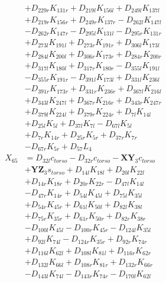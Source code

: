 \begin{multicols}{2}
\begin{align}
&+ D_{229r}K_{131r} + D_{219l}K_{156l} + D_{249l}K_{137l}  \nonumber \\
&+ D_{219r}K_{156r} + D_{249r}K_{137r} - D_{262l}K_{147l}  \nonumber \\
&- D_{262r}K_{147r} - D_{295l}K_{131l} - D_{295r}K_{131r}  \nonumber \\
&+ D_{273l}K_{191l} + D_{273r}K_{191r} + D_{306l}K_{173l}  \nonumber \\
&+ D_{284l}K_{200l} + D_{306r}K_{173r} + D_{284r}K_{200r}  \nonumber \\
&+ D_{317l}K_{180l} + D_{317r}K_{180r} - D_{355l}K_{191l}  \nonumber \\
&- D_{355r}K_{191r} - D_{391l}K_{173l} + D_{331l}K_{236l}  \nonumber \\
&- D_{391r}K_{173r} + D_{331r}K_{236r} + D_{367l}K_{216l}  \nonumber \\
&+ D_{343l}K_{247l} + D_{367r}K_{216r} + D_{343r}K_{247r}  \nonumber \\
&+ D_{379l}K_{224l} + D_{379r}K_{224r} + D_{7l}K_{14l}  \nonumber \\
&+ D_{25l}K_{5l} + D_{37l}K_{7l} - D_{67l}K_{5l}  \nonumber \\
&+ D_{7r}K_{14r} + D_{25r}K_{5r} + D_{37r}K_{7r}  \nonumber \\
&- D_{67r}K_{5r} + D_{57}L_4 \nonumber \\
X_{65} &= D_{32l}c_{torso} - D_{32r}c_{torso} - \mathbf{XY}_3c_{torso}  \nonumber \\
&+ \mathbf{YZ}_3s_{torso} + D_{14l}K_{18l} + D_{20l}K_{22l}  \nonumber \\
&+ D_{14r}K_{18r} + D_{20r}K_{22r} - D_{47l}K_{14l}  \nonumber \\
&- D_{47r}K_{14r} + D_{54l}K_{45l} + D_{75l}K_{35l}  \nonumber \\
&+ D_{54r}K_{45r} + D_{61l}K_{50l} + D_{82l}K_{38l}  \nonumber \\
&+ D_{75r}K_{35r} + D_{61r}K_{50r} + D_{82r}K_{38r}  \nonumber \\
&- D_{100l}K_{45l} - D_{100r}K_{45r} - D_{124l}K_{35l}  \nonumber \\
&+ D_{92l}K_{74l} - D_{124r}K_{35r} + D_{92r}K_{74r}  \nonumber \\
&+ D_{116l}K_{62l} + D_{108l}K_{81l} + D_{116r}K_{62r}  \nonumber \\
&+ D_{132l}K_{66l} + D_{108r}K_{81r} + D_{132r}K_{66r}  \nonumber \\
&- D_{143l}K_{74l} - D_{143r}K_{74r} - D_{170l}K_{62l}  \nonumber \\

\end{align}
\end{multicols}
